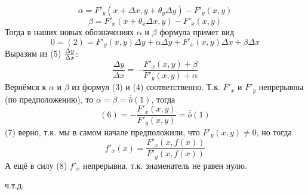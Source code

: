 \documentclass[book, 11pt]{report}
\begin{document}
{\begin{equation}
        \alpha=F'_y(x+\Delta x,y+\theta_y\Delta y)-F'_y(x,y)
    \end{equation}
    \begin{equation}
        \beta=F'_x(x+\theta_x\Delta x,y)-F'_x(x,y)
    \end{equation}
    Тогда в наших новых обозначениях $\alpha$ и $\beta$ формула примет вид
    \begin{equation}
        0=(2)=F'_y(x,y)\Delta y+\alpha\Delta y+F'_x(x,y)\Delta x+\beta\Delta x
    \end{equation}
    Выразим из (5) $\Delta y\over\Delta x$:
    \begin{equation}
        \frac{\Delta y}{\Delta x}=-\frac{F'_x(x,y)+\beta}{F'_y(x,y)+\alpha}
    \end{equation}
    Вернёмся к $\alpha$ и $\beta$ из формул (3) и (4) соответственно. Т.к. $F'_x$ и $F'_y$ непрерывны (по предположению), то $\alpha=\beta=\bar{\bar{o}}(1)$, тогда
    \begin{equation}
        (6)=-\frac{F'_x(x,y)}{F'_y(x,y)}=\bar{\bar{o}}(1)
    \end{equation}
    (7) верно, т.к. мы в самом начале предположили, что $F'_y(x,y)\ne0$, но тогда
    \begin{equation}
        f'_x(x)=\frac{F'_x(x,f(x))}{F'_y(x,f(x))}
    \end{equation}
    А ещё в силу (8) $f'_x$ непрерывна, т.к. знаменатель не равен нулю.
    }
    \par{{\raggedleft ч.т.д.\par}}
    \vspace{0.5cm}
    \setcounter{equation}{0}
\end{document}
